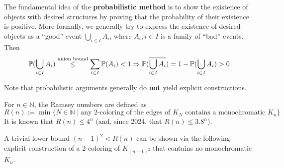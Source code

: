 \documentclass[../main.tex]{subfiles}
\begin{document}
The fundamental idea of the \textbf{probabilistic method} is to show the existence of objects with desired structures by proving that the probability of their existence is positive. More formally, we generally try to express the existence of desired objects as a \enquote{good} event $\overline{\bigcup_{i \in I} A_i}$, where $A_i, i \in I$ is a family of \enquote{bad} events. Then
\begin{equation}
	\mathbb{P}(\bigcup_{i \in I} A_i) \overset{\text{union bound}}{\leq} \sum_{i \in I} \mathbb{P}(A_i) < 1 \Rightarrow \mathbb{P}(\overline{\bigcup_{i \in I} A_i}) = 1 - \mathbb{P}(\bigcup_{i \in I} A_i) > 0
\end{equation}

\begin{remark}
	Note that probabilistic arguments generally do \textbf{not} yield explicit constructions.
\end{remark}

\begin{example}
	For $n \in \mathbb{N}$, the Ramsey numbers are defined as 
	$$R(n) := \min\{N \in \mathbb{N} \mid \text{any 2-coloring of the edges of } K_N \text{ contains a monochromatic } K_n\}$$
	It is known that $R(n) \leq 4^n$ (and, since 2024, that $R(n) \leq 3.8^n$).
	
	A trivial lower bound $(n-1)^2 < R(n)$ can be shown via the following explicit construction of a 2-coloring of $K_{(n-1)^2}$ that contains no monochromatic $K_n$. 
\end{example}


		
\end{document}
